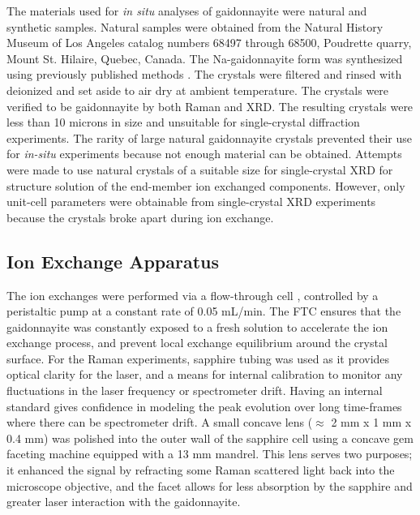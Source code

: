 \documentclass[journal=acsodf,manuscript=article]{achemso}
\begin{document}
The materials used for \emph{in situ} analyses of gaidonnayite were
natural and synthetic samples.  Natural samples were obtained from the
Natural History Museum of Los Angeles catalog numbers 68497 through
68500, Poudrette quarry, Mount St. Hilaire, Quebec, Canada.  The
Na-gaidonnayite form was synthesized using previously published
methods \cite{Lin_1999}. The crystals were filtered and rinsed with
deionized  and set aside to air dry at ambient
temperature. The crystals were verified to be gaidonnayite by both Raman
and XRD.  The resulting crystals were less than 10 microns in size and
unsuitable for single-crystal diffraction experiments. The rarity of
large natural gaidonnayite crystals prevented their use for
\emph{in-situ} experiments because not enough material can be obtained.  Attempts were made to use natural crystals of a suitable size for
single-crystal XRD for structure solution of the end-member ion exchanged components.  However, only unit-cell parameters were obtainable from single-crystal XRD experiments because the crystals broke apart during ion exchange.



\subsection{Ion Exchange Apparatus}

{\label{methods_ion_exch_app}}  %

The ion exchanges were performed via a flow-through
cell \cite{Celestian2008}, controlled by a peristaltic pump at a constant
rate of 0.05 mL/min. The FTC ensures that the gaidonnayite was
constantly exposed to a fresh solution to accelerate the ion exchange
process, and prevent local exchange equilibrium around the crystal surface.  For the Raman experiments, sapphire tubing was used as it
provides optical clarity for the laser, and a means for internal calibration to monitor any fluctuations in
the laser frequency or spectrometer drift.  Having an internal standard gives confidence in
modeling the peak evolution over long time-frames where there can be spectrometer drift.  A small concave lens
(\(\approx\) 2 mm x 1 mm x 0.4 mm) was polished into the outer wall of
the sapphire cell using a concave gem faceting machine equipped with a
13 mm mandrel.  This lens serves two purposes; it enhanced the signal by
refracting some Raman scattered light back into the microscope
objective, and the facet allows for less absorption by the sapphire and
greater laser interaction with the gaidonnayite.
\end{document}
